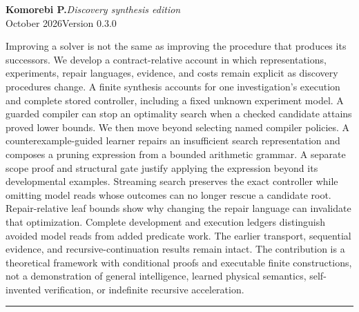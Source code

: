 \documentclass[11pt,letterpaper]{article}
\theoremstyle{plain}
\theoremstyle{definition}
\begin{document}
\hypersetup{pageanchor=false}
\begin{titlepage}\thispagestyle{empty}
\vspace*{.25in}
\par
\vspace{.65in}
\vspace{.19in}
\vspace{.27in}\noindent{\color{ink}\rule{\textwidth}{.85pt}}\par
\vspace{.16in}
\noindent\textbf{Komorebi P.}\hfill\textit{Discovery synthesis edition}\\
 October 2026\hfill Version 0.3.0\par
\vspace{.38in}
\par\smallskip
\noindent Improving a solver is not the same as improving the procedure that produces its successors. We develop a contract-relative account in which representations, experiments, repair languages, evidence, and costs remain explicit as discovery procedures change. A finite synthesis accounts for one investigation's execution and complete stored controller, including a fixed unknown experiment model. A guarded compiler can stop an optimality search when a checked candidate attains proved lower bounds. We then move beyond selecting named compiler policies. A counterexample-guided learner repairs an insufficient search representation and composes a pruning expression from a bounded arithmetic grammar. A separate scope proof and structural gate justify applying the expression beyond its developmental examples. Streaming search preserves the exact controller while omitting model reads whose outcomes can no longer rescue a candidate root. Repair-relative leaf bounds show why changing the repair language can invalidate that optimization. Complete development and execution ledgers distinguish avoided model reads from added predicate work. The earlier transport, sequential evidence, and recursive-continuation results remain intact. The contribution is a theoretical framework with conditional proofs and executable finite constructions, not a demonstration of general intelligence, learned physical semantics, self-invented verification, or indefinite recursive acceleration.
\vfill\noindent\rule{\textwidth}{.4pt}\par\smallskip
{}
\end{titlepage}
\hypersetup{pageanchor=true}
\begingroup\small\setlength{\parskip}{0pt}\tableofcontents\endgroup\clearpage
\end{document}
